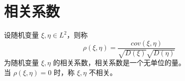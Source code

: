 \documentclass[12pt,a4paper]{amsart}
\begin{document}
\section{相关系数}

\begin{definition}[相关系数]
    设随机变量 $\xi, \eta \in L^2$，则称
    \begin{equation}
        \rho(\xi, \eta) = \frac{cov(\xi, \eta)}{\sqrt{D(\xi)}\sqrt{D(\eta)}}
    \end{equation}
    为随机变量 $\xi, \eta$ 的相关系数，相关系数是一个无单位的量。 \\
    当 $\rho(\xi, \eta) = 0$ 时，称 $\xi, \eta$ 不相关。
\end{definition}

\appendix



{\footnotesize}
\end{document}
